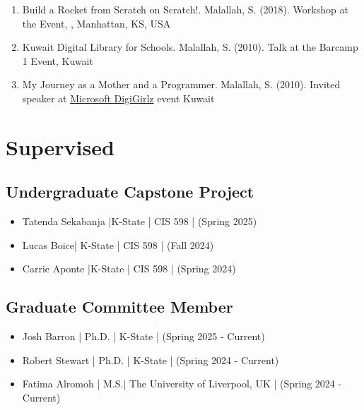 \documentclass[11pt]{article}
\begin{document}
\begin{enumerate}
\item Build a Rocket from Scratch on Scratch!. Malallah, S. (2018). Workshop at the { } Event,  {, Manhattan, KS, USA  }










\item Kuwait Digital Library for Schools. Malallah, S. (2010). Talk at the Barcamp 1 Event, Kuwait {\href{https://barcampkw.wordpress.com/2010/10/16/barcamp-kuwait-one/}{\color{icnclr} \faGlobe[regular] }}



\item My Journey as a Mother and a Programmer.  Malallah, S.  (2010). Invited speaker at \href{https://news.microsoft.com/2010/05/04/digigirlz-program-ten-years-inspiring-high-school-girls-to-explore-careers-in-technology/}{Microsoft DigiGirlz}  event Kuwait




\end{enumerate}



\section{Supervised} %
\subsection{Undergraduate Capstone Project}
\begin{itemize}
    \item  Tatenda Sekabanja |K-State | CIS 598 | (Spring 2025)
    \item  Lucas Boice| K-State | CIS 598 | (Fall 2024)
    \item  Carrie Aponte |K-State | CIS 598 | (Spring 2024)
\end{itemize}
\subsection{Graduate Committee Member}
\begin{itemize}
    \item  Josh Barron | Ph.D. | K-State | (Spring 2025 - Current)
    \item  Robert Stewart | Ph.D. | K-State | (Spring 2024 - Current)
    \item  Fatima Alromoh  | M.S.| The University of Liverpool, UK | (Spring 2024 - Current)
\end{itemize}
\end{document}
